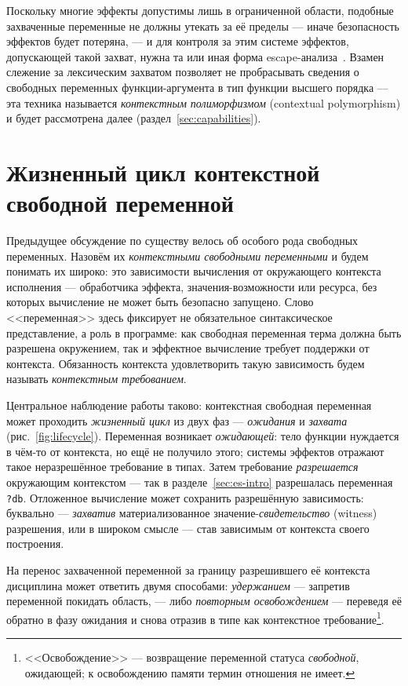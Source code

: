 \documentclass{ProcISPRAS}
\begin{document}
Поскольку многие эффекты допустимы лишь в ограниченной области, подобные захваченные
переменные не должны утекать за её пределы --- иначе безопасность эффектов будет
потеряна, --- и для контроля за этим системе эффектов, допускающей такой захват, нужна
та или иная форма
escape-анализа~\cite{park1992escape, hannan1998type}. Взамен слежение за лексическим
захватом позволяет не пробрасывать сведения о свободных переменных функции-аргумента в
тип функции высшего порядка --- эта техника называется \emph{контекстным полиморфизмом} (contextual polymorphism)
и будет рассмотрена далее (раздел~\ref{sec:capabilities}).


\section{Жизненный цикл контекстной свободной переменной}
\label{sec:idea}

Предыдущее обсуждение по существу велось об особого рода свободных переменных.
Назовём их \emph{контекстными свободными переменными} и будем понимать их широко: это
зависимости вычисления от окружающего контекста исполнения
--- обработчика эффекта, значения-возможности или ресурса, без
которых вычисление не может быть безопасно запущено. Слово <<переменная>> здесь фиксирует
не обязательное синтаксическое представление, а роль в программе: как свободная переменная
терма должна быть разрешена окружением, так и эффектное вычисление требует поддержки от
контекста. Обязанность контекста удовлетворить такую зависимость будем называть
\emph{контекстным требованием}.

Центральное наблюдение работы таково: контекстная свободная переменная может проходить
\emph{жизненный цикл} из двух фаз --- \emph{ожидания} и \emph{захвата}
(рис.~\ref{fig:lifecycle}). Переменная возникает \emph{ожидающей}: тело функции
нуждается в чём-то от контекста, но ещё не получило этого; системы эффектов отражают
такое неразрешённое требование в типах. Затем требование
\emph{разрешается} окружающим контекстом --- так в разделе~\ref{sec:es-intro}
разрешалась переменная \lstinline|?db|. Отложенное вычисление может сохранить разрешённую зависимость:
буквально --- \emph{захватив} материализованное значение-\emph{свидетельство}
(witness) разрешения, или в
широком смысле --- став зависимым от контекста своего построения.

На перенос захваченной переменной за границу разрешившего её контекста дисциплина может
ответить двумя способами: \emph{удержанием} --- запретив переменной покидать область, --- либо
\emph{повторным освобождением} --- переведя её обратно в фазу ожидания и снова отразив в
типе как контекстное требование\footnote{<<Освобождение>> --- возвращение переменной
статуса \emph{свободной}, ожидающей; к освобождению памяти термин отношения не имеет.}.
\end{document}
